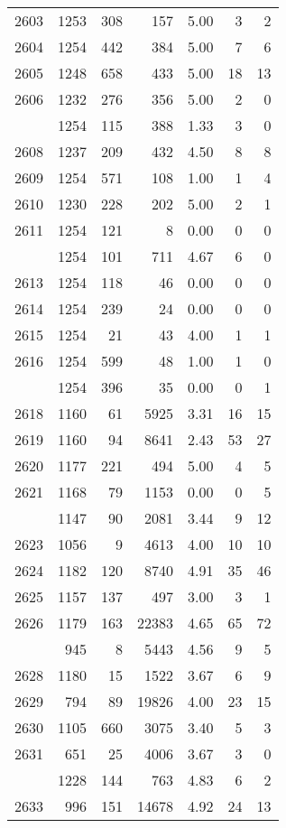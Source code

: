 \documentclass[
]{article}
\begin{document}
\begin{table}
\begin{tabular}[t]{lrrrrrr}
2603 & 1253 & 308 & 157 & 5.00 & 3 & 2\\
2604 & 1254 & 442 & 384 & 5.00 & 7 & 6\\
2605 & 1248 & 658 & 433 & 5.00 & 18 & 13\\
2606 & 1232 & 276 & 356 & 5.00 & 2 & 0\\
\addlinespace
2607 & 1254 & 115 & 388 & 1.33 & 3 & 0\\
2608 & 1237 & 209 & 432 & 4.50 & 8 & 8\\
2609 & 1254 & 571 & 108 & 1.00 & 1 & 4\\
2610 & 1230 & 228 & 202 & 5.00 & 2 & 1\\
2611 & 1254 & 121 & 8 & 0.00 & 0 & 0\\
\addlinespace
2612 & 1254 & 101 & 711 & 4.67 & 6 & 0\\
2613 & 1254 & 118 & 46 & 0.00 & 0 & 0\\
2614 & 1254 & 239 & 24 & 0.00 & 0 & 0\\
2615 & 1254 & 21 & 43 & 4.00 & 1 & 1\\
2616 & 1254 & 599 & 48 & 1.00 & 1 & 0\\
\addlinespace
2617 & 1254 & 396 & 35 & 0.00 & 0 & 1\\
2618 & 1160 & 61 & 5925 & 3.31 & 16 & 15\\
2619 & 1160 & 94 & 8641 & 2.43 & 53 & 27\\
2620 & 1177 & 221 & 494 & 5.00 & 4 & 5\\
2621 & 1168 & 79 & 1153 & 0.00 & 0 & 5\\
\addlinespace
2622 & 1147 & 90 & 2081 & 3.44 & 9 & 12\\
2623 & 1056 & 9 & 4613 & 4.00 & 10 & 10\\
2624 & 1182 & 120 & 8740 & 4.91 & 35 & 46\\
2625 & 1157 & 137 & 497 & 3.00 & 3 & 1\\
2626 & 1179 & 163 & 22383 & 4.65 & 65 & 72\\
\addlinespace
2627 & 945 & 8 & 5443 & 4.56 & 9 & 5\\
2628 & 1180 & 15 & 1522 & 3.67 & 6 & 9\\
2629 & 794 & 89 & 19826 & 4.00 & 23 & 15\\
2630 & 1105 & 660 & 3075 & 3.40 & 5 & 3\\
2631 & 651 & 25 & 4006 & 3.67 & 3 & 0\\
\addlinespace
2632 & 1228 & 144 & 763 & 4.83 & 6 & 2\\
2633 & 996 & 151 & 14678 & 4.92 & 24 & 13\\

\end{tabular}
\end{table}
\end{document}
